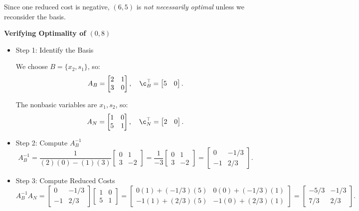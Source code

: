 \begin{solution}
\begin{itemize}
Since one reduced cost is negative, \( (6,5) \) is \emph{not necessarily optimal} unless we reconsider the basis.
\end{itemize}

\textbf{Verifying Optimality of \( (0,8) \)}

\begin{itemize}
\item {Step 1: Identify the Basis}

We choose \(B= \{x_2, s_1\} \), so:
\[
A_B =
\begin{bmatrix}
    2 & 1 \\
    3 & 0
\end{bmatrix}, \quad
\c_B^\top =
\begin{bmatrix}
    5 & 0
\end{bmatrix}.
\]

The nonbasic variables are \( x_1, s_2 \), so:
\[
A_N =
\begin{bmatrix}
    1 & 0 \\
    5 & 1
\end{bmatrix}, \quad
\c_N^\top =
\begin{bmatrix}
    2 & 0
\end{bmatrix}.
\]

\item {Step 2: Compute \( A_B^{-1} \)}
\[
A_B^{-1} =
\frac{1}{(2)(0) - (1)(3)}
\begin{bmatrix}
    0 & 1 \\
    3 & -2
\end{bmatrix}
=
\frac{1}{-3}
\begin{bmatrix}
    0 & 1 \\
    3 & -2
\end{bmatrix}
=
\begin{bmatrix}
    0 & -1/3 \\
    -1 & 2/3
\end{bmatrix}.
\]


\item {Step 3: Compute Reduced Costs}
\[
A_B^{-1} A_N =
\begin{bmatrix}
    0 & -1/3 \\
    -1 & 2/3
\end{bmatrix}
\begin{bmatrix}
    1 & 0 \\
    5 & 1
\end{bmatrix}
=
\begin{bmatrix}
    0(1) + (-1/3)(5) & 0(0) + (-1/3)(1) \\
    -1(1) + (2/3)(5) & -1(0) + (2/3)(1)
\end{bmatrix}
=
\begin{bmatrix}
    -5/3 & -1/3 \\
    7/3 & 2/3
\end{bmatrix}.
\]


\end{itemize}
\end{solution}
